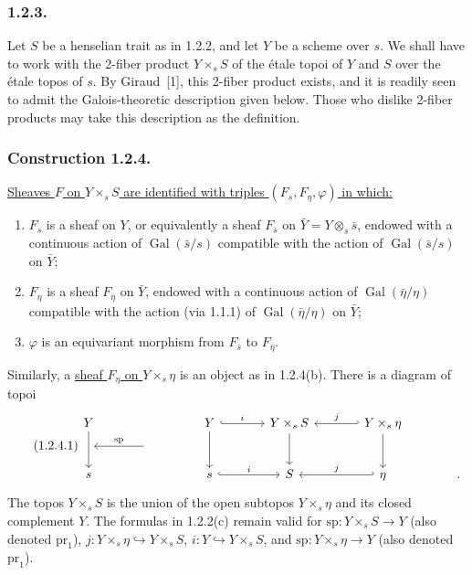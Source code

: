 \subsubsection*{1.2.3.}
Let $S$ be a henselian trait as in 1.2.2, and let $Y$ be a scheme over
$s$.  We shall have to work with the 2-fiber product $Y\times_sS$ of
the \'{e}tale topoi of $Y$ and $S$ over the \'{e}tale topos of $s$.
By Giraud~[1], this 2-fiber product exists, and it is readily seen to
admit the Galois-theoretic description given below.  Those who dislike
2-fiber products may take this description as the definition.

\subsubsection*{Construction 1.2.4.}
\underline{Sheaves $F$ on $Y\times_sS$ are identified with triples
$(F_s,F_\eta,\varphi)$ in which:}
\begin{enumerate}[label=(\alph*)]
\item $F_s$ is a sheaf on $Y$, or equivalently a sheaf $F_{\bar s}$
on $\bar Y=Y\otimes_s\bar s$, endowed with a continuous action of
$\operatorname{Gal}(\bar s/s)$ compatible with the action of
$\operatorname{Gal}(\bar s/s)$ on $\bar Y$;

\item $F_\eta$ is a sheaf $F_{\bar\eta}$ on $\bar Y$, endowed with a
continuous action of $\operatorname{Gal}(\bar\eta/\eta)$ compatible
with the action (via 1.1.1) of $\operatorname{Gal}(\bar\eta/\eta)$ on
$\bar Y$;

\item $\varphi$ is an equivariant morphism from $F_{\bar s}$ to
$F_{\bar\eta}$.
\end{enumerate}
Similarly, a \underline{sheaf $F_\eta$ on $Y\times_s\eta$} is an
object as in 1.2.4(b).  There is a diagram of topoi
\begin{equation}\tag{1.2.4.1}
\begin{tikzcd}[column sep=large, row sep=small]
Y \arrow[dd] & {} & Y \arrow[r, hook, "i"] \arrow[dd]
  & Y\times_sS \arrow[dd]
  & Y\times_s\eta \arrow[l, hook', "j"'] \arrow[dd] & {} \\
{} & {} \arrow[l, "\mathrm{sp}"'] & {} & {} & {} & {} \\
s & {} & s \arrow[r, hook, "i"] & S
  & \eta \arrow[l, hook', "j"'] & {.}
\end{tikzcd}
\end{equation}
The topos $Y\times_sS$ is the union of the open subtopos
$Y\times_s\eta$ and its closed complement $Y$.  The formulas in
1.2.2(c) remain valid for
$\mathrm{sp}:Y\times_sS\longrightarrow Y$ (also denoted
$\mathrm{pr}_1$), $j:Y\times_s\eta\hookrightarrow Y\times_sS$,
$i:Y\hookrightarrow Y\times_sS$, and
$\mathrm{sp}:Y\times_s\eta\longrightarrow Y$ (also denoted
$\mathrm{pr}_1$).

